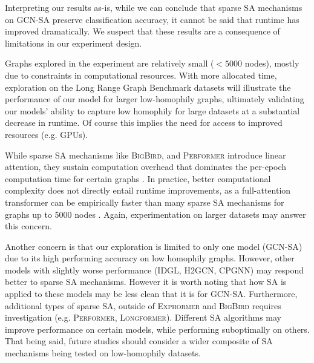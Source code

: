 Interpreting our results as-is, while we can conclude that sparse SA
mechanisms on GCN-SA preserve classification accuracy,
it cannot be said that runtime has improved dramatically.
We suspect that these results are a consequence
of limitations in our experiment design.

Graphs explored in the experiment are 
relatively small ($ < 5000 $ nodes),
mostly due to constraints in computational resources.
With more allocated time, exploration on the
Long Range Graph Benchmark datasets \citep{dwivedi2022long}
will illustrate the performance of our model for
larger low-homophily graphs, ultimately validating our models'
ability to capture low homophily for large datasets
at a substantial decrease in runtime. 
Of course this implies the need for access
to improved resources (e.g. GPUs).


While sparse SA mechanisms like \textsc{BigBird}, 
and \textsc{Performer} introduce linear attention, they sustain 
computation overhead that dominates the per-epoch
computation time for certain graphs \citep{shirzad2023exphormer}.
In practice, better computational complexity does not
directly entail runtime improvements, as a full-attention transformer 
can be empirically faster than many sparse SA mechanisms for graphs up to 5000 nodes 
\citep{shirzad2023exphormer}. 
Again, experimentation on larger datasets may answer this concern.

Another concern is that
our exploration is limited to only one model (\textsc{GCN-SA})
due to its high performing accuracy on low homophily graphs. However,
other models with slightly worse performance (\textsc{IDGL},
\textsc{H2GCN}, \textsc{CPGNN}) \citep{jiang2024self} 
may respond better to sparse SA mechanisms. 
However it is worth noting that how SA is applied to these models
may be less clean that it is for GCN-SA.
Furthermore, additional types of sparse SA, outside 
of \textsc{Exphormer} and \textsc{BigBird} requires
investigation (e.g. \textsc{Performer}, \textsc{Longformer}).
Different SA algorithms may improve 
performance on certain models, while performing
suboptimally on others. That being said, future 
studies should consider a wider composite of SA 
mechanisms being tested on low-homophily datasets.

